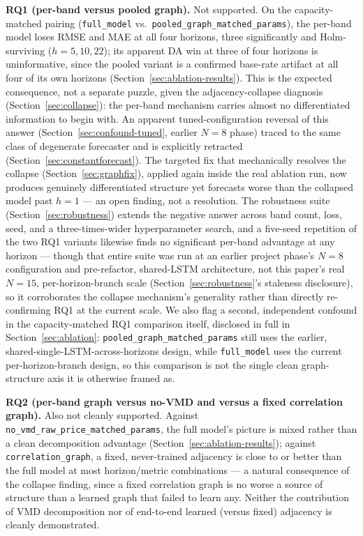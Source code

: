 \documentclass[journal]{IEEEtran}
\begin{document}
\textbf{RQ1 (per-band versus pooled graph).} Not supported. On the capacity-matched pairing (\texttt{full\_model} vs.\ \texttt{pooled\_graph\_matched\_params}), the per-band model loses RMSE and MAE at all four horizons, three significantly and Holm-surviving ($h=5,10,22$); its apparent DA win at three of four horizons is uninformative, since the pooled variant is a confirmed base-rate artifact at all four of its own horizons (Section~\ref{sec:ablation-results}). This is the expected consequence, not a separate puzzle, given the adjacency-collapse diagnosis (Section~\ref{sec:collapse}): the per-band mechanism carries almost no differentiated information to begin with. An apparent tuned-configuration reversal of this answer (Section~\ref{sec:confound-tuned}, earlier $N=8$ phase) traced to the same class of degenerate forecaster and is explicitly retracted (Section~\ref{sec:constantforecast}). The targeted fix that mechanically resolves the collapse (Section~\ref{sec:graphfix}), applied again inside the real ablation run, now produces genuinely differentiated structure yet forecasts worse than the collapsed model past $h=1$ --- an open finding, not a resolution. The robustness suite (Section~\ref{sec:robustness}) extends the negative answer across band count, loss, seed, and a three-times-wider hyperparameter search, and a five-seed repetition of the two RQ1 variants likewise finds no significant per-band advantage at any horizon --- though that entire suite was run at an earlier project phase's $N=8$ configuration and pre-refactor, shared-LSTM architecture, not this paper's real $N=15$, per-horizon-branch scale (Section~\ref{sec:robustness}'s staleness disclosure), so it corroborates the collapse mechanism's generality rather than directly re-confirming RQ1 at the current scale. We also flag a second, independent confound in the capacity-matched RQ1 comparison itself, disclosed in full in Section~\ref{sec:ablation}: \texttt{pooled\_graph\_matched\_params} still uses the earlier, shared-single-LSTM-across-horizons design, while \texttt{full\_model} uses the current per-horizon-branch design, so this comparison is not the single clean graph-structure axis it is otherwise framed as.

\textbf{RQ2 (per-band graph versus no-VMD and versus a fixed correlation graph).} Also not cleanly supported. Against \texttt{no\_vmd\_raw\_price\_matched\_params}, the full model's picture is mixed rather than a clean decomposition advantage (Section~\ref{sec:ablation-results}); against \texttt{correlation\_graph}, a fixed, never-trained adjacency is close to or better than the full model at most horizon/metric combinations --- a natural consequence of the collapse finding, since a fixed correlation graph is no worse a source of structure than a learned graph that failed to learn any. Neither the contribution of VMD decomposition nor of end-to-end learned (versus fixed) adjacency is cleanly demonstrated.
\end{document}

